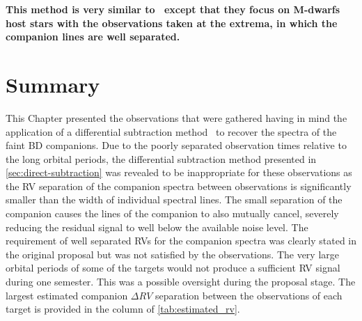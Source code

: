 \textbf{This method is very similar to~\citet{kostogryz_spectral_2013} except that they focus on M-dwarfs host stars with the observations taken at the extrema, in which the companion lines are well separated. 
}
\section{Summary}
This Chapter presented the observations that were gathered having in mind the application of a differential subtraction method~\citep[e.g.][]{ferluga_separating_1997, kostogryz_spectral_2013} to recover the spectra of the faint {BD} companions.  Due to the poorly separated observation times relative to the long orbital periods, the differential subtraction method presented in \cref{sec:direct-subtraction} was revealed to be inappropriate for these observations as the {RV} separation of the companion spectra between observations is significantly smaller than the width of individual spectral lines.
The small separation of the companion causes the lines of the companion to also mutually cancel, severely reducing the residual signal to well below the available noise level.
The requirement of well separated RVs for the companion spectra was clearly stated in the original proposal but was not satisfied by the observations. {\red{} The very large orbital periods of some of the targets would not produce a sufficient {RV} signal during one semester.
This was a possible oversight during the proposal stage.} The largest estimated companion \(\Delta {RV}\) separation between the observations of each target is provided in the   column of \cref{tab:estimated_rv}. 
